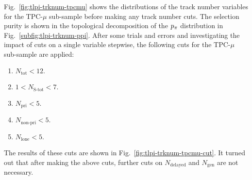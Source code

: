 Fig.~\ref{fig:tlpi-trknum-tpcmu} shows the distributions of the track number variables for the TPC-$\mu$ sub-sample before making any track number cuts.
The selection purity is shown in the topological decomposition of the $p_{\pi}$ distribution in Fig.~\ref{subfig:tlpi-trknum-ppi}.
After some trials and errors and investigating the impact of cuts on a single variable stepwise, the following cuts for the TPC-$\mu$ sub-sample are applied:
\begin{enumerate}
    \item $N_{\textrm{tot}}<12$.
    \item $1<N_{\textrm{S-tot}}<7$.
    \item $N_{\textrm{pri}}<5$.
    \item $N_{\textrm{non-pri}}<5$.
    \item $N_{\textrm{lone}}<5$.
\end{enumerate}
The results of these cuts are shown in Fig.~\ref{fig:tlpi-trknum-tpcmu-cut}.
It turned out that after making the above cuts, further cuts on $N_{\textrm{delayed}}$ and $N_{\textrm{gen}}$ are not necessary.
